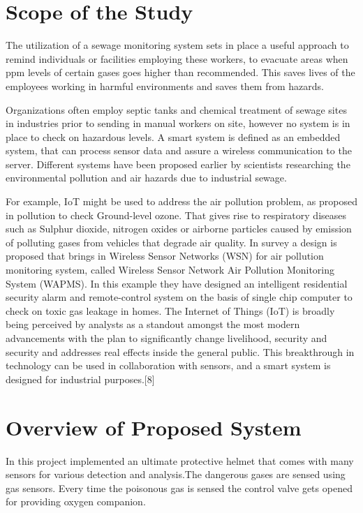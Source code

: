 \documentclass[12pt,a4paper]{report}
\begin{document}
\noindent 


\section{ Scope of the Study}

\noindent The utilization of a sewage monitoring system sets in place a useful approach to remind individuals or facilities employing these workers, to evacuate areas when ppm levels of certain gases goes higher than recommended. This saves lives of the employees working in harmful environments and saves them from hazards.

\noindent Organizations often employ septic tanks and chemical treatment of sewage sites in industries prior to sending in manual workers on site, however no system is in place to check on hazardous levels. A smart system is defined as  an embedded system, that can process sensor data and assure a wireless communication to the server. Different systems have been proposed earlier by scientists researching the environmental pollution and air hazards due to industrial sewage.

\noindent For example, IoT might be used to address the air pollution problem, as proposed in pollution to check Ground-level ozone. That gives rise to respiratory diseases such as Sulphur dioxide, nitrogen oxides or airborne particles caused by emission of polluting gases from vehicles that degrade air quality. In survey a design is proposed that brings in Wireless Sensor Networks (WSN) for air pollution monitoring system, called Wireless Sensor Network Air Pollution Monitoring System (WAPMS). In this example they have designed an intelligent residential security alarm and remote-control system on the basis of single chip computer to check on toxic gas leakage in homes. The Internet of Things (IoT) is broadly being perceived by analysts as a standout amongst the most modern advancements with the plan to significantly change livelihood, security and security and addresses real effects inside the general public. This breakthrough in technology can be used in collaboration with sensors, and a smart system is designed for industrial purposes.[8]

\noindent 


\section{ Overview of Proposed System}

\noindent                          In this project  implemented an ultimate protective helmet that comes with many sensors for various detection and analysis.The dangerous gases are sensed using gas sensors. Every time the poisonous gas is sensed the control valve gets opened for providing oxygen companion.
\end{document}
